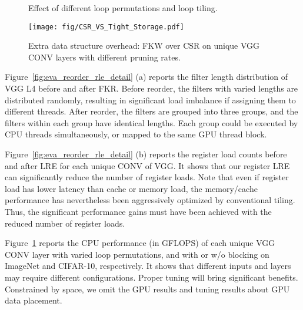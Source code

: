 \documentclass[sigplan,screen]{acmart}
\begin{document}
\begin{figure}[t]
    \centering
        \caption{Effect of different loop permutations and loop tiling.}
    \label{fig:eva_four_comp_tuning}
\end{figure}

\begin{figure}[t]
    \centering
    \texttt{[image: fig/CSR\_VS\_Tight\_Storage.pdf]}
\caption{Extra data structure overhead: FKW over CSR on unique VGG CONV layers with different pruning rates.}
    \label{fig:eva_csr_tight_storage}
\end{figure}



Figure~\ref{fig:eva_reorder_rle_detail} (a) reports the filter length distribution of VGG L4 before and after FKR. Before reorder, the filters with varied lengths are distributed randomly, resulting in significant load imbalance if assigning them to different threads. After reorder, the filters are grouped into three groups, and the filters within each group have identical lengths. Each group could be executed by CPU threads simultaneously, or mapped to the same GPU thread block.



Figure~\ref{fig:eva_reorder_rle_detail} (b) reports the register load counts before and after LRE for each unique CONV of VGG. It shows that our register LRE can significantly reduce the number of register loads. 
Note that even if register load has lower
latency than cache or memory load, the memory/cache
performance has nevertheless been aggressively
optimized by conventional tiling. 
Thus, the significant performance gains
must have been achieved with the reduced
number of register loads. 




Figure~\ref{fig:eva_four_comp_tuning} reports 
the CPU performance (in GFLOPS) of each unique VGG CONV layer with varied loop permutations, and with or w/o 
blocking on ImageNet and CIFAR-10, respectively. It shows that different inputs and layers may require different configurations. 
Proper tuning will bring significant benefits. Constrained by space, we omit the GPU results and tuning results about GPU data placement.   
\end{document}
